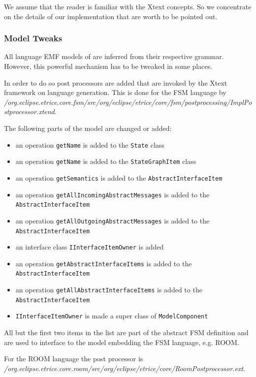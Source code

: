 We assume that the reader is familiar with the Xtext concepts. So we concentrate on the details of our 
implementation that are worth to be pointed out.

\subsubsection{Model Tweaks}

All language EMF models of \eTrice{} are inferred from their respective grammar.
However, this powerful mechanism has to be tweaked in some places.

In order to do so post processors are added that are invoked by the Xtext framework on language generation.
This is done for the FSM language by \textit{/org.eclipse.etrice.core.fsm/src/org/eclipse/etrice/core/fsm/postprocessing/ImplPostprocessor.xtend}.

The following parts of the model are changed or added:
\begin{itemize}
\item an operation \texttt{getName} is added to the \texttt{State} class
\item an operation \texttt{getName} is added to the \texttt{StateGraphItem} class
\item an operation \texttt{getSemantics} is added to the \texttt{AbstractInterfaceItem}
\item an operation \texttt{getAllIncomingAbstractMessages} is added to the \texttt{AbstractInterfaceItem}
\item an operation \texttt{getAllOutgoingAbstractMessages} is added to the \texttt{AbstractInterfaceItem}
\item an interface class \texttt{IInterfaceItemOwner} is added
\item an operation \texttt{getAbstractInterfaceItems} is added to the \texttt{AbstractInterfaceItem}
\item an operation \texttt{getAllAbstractInterfaceItems} is added to the \texttt{AbstractInterfaceItem}
\item \texttt{IInterfaceItemOwner} is made a super class of \texttt{ModelComponent}
\end{itemize}
All but the first two items in the list are part of the abstract FSM definition and are used to interface
to the model embedding the FSM language, e.g. ROOM.

For the ROOM language the post processor is
\textit{/org.eclipse.etrice.core.room/src/org/eclipse/etrice/core/RoomPostprocessor.ext}.

